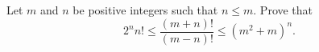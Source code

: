Let $m$ and $n$ be positive integers such that $n \leq m$.  Prove that \[ 2^n n! \leq \frac{(m+n)!}{(m-n)!} \leq (m^2 + m)^n. \]
